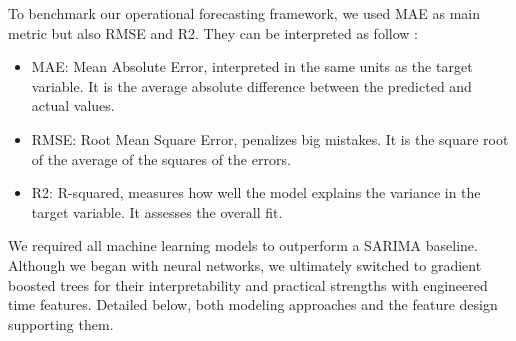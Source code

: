 To benchmark our operational forecasting framework, we used MAE as main metric but also 
RMSE and R2. They can be interpreted as follow :
\vspace{-0.4cm}
\begin{itemize}
    \item MAE: Mean Absolute Error, interpreted in the same units as the target variable. 
    It is the average absolute difference between the predicted and actual values.
    \item RMSE: Root Mean Square Error, penalizes big mistakes. It is the square root of 
    the average of the squares of the errors.
    \item R2: R-squared, measures how well the model explains the variance in the target 
    variable. It assesses the overall fit.
\end{itemize}

We required all machine learning models to outperform a SARIMA baseline. 
Although we began with neural networks, we ultimately switched to gradient boosted trees 
for their interpretability and practical strengths with engineered time features. Detailed below,
both modeling approaches and the feature design supporting them.

